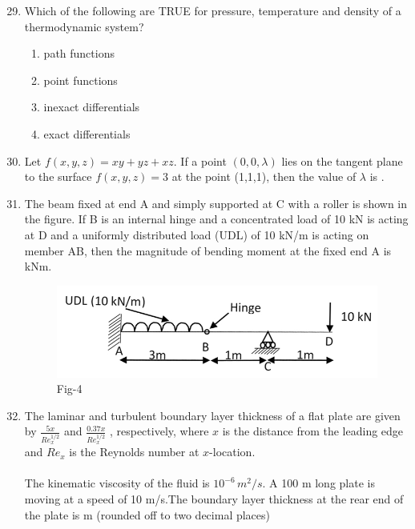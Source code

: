 \documentclass[journal]{IEEEtran}
\theoremstyle{remark}
\begin{document}
\begin{enumerate}[itemsep=1em]
\setcounter{enumi}{28}
\item Which of the following are TRUE for pressure, temperature and density of a thermodynamic system?
\begin{enumerate}[leftmargin=2.5em, labelsep=0.5em, itemsep=0.5em]
    \item path functions 
    \item point functions 
    \item inexact differentials 
    \item exact differentials 
\end{enumerate}
\end{enumerate}

\begin{enumerate}[itemsep=1em]
\setcounter{enumi}{29}
\item Let $f(x,y,z)=xy+yz+xz$. If a point $(0,0,\lambda)$ lies on the tangent plane to the surface $f(x,y,z)=3$ at the point (1,1,1), then the value of $\lambda$ is \underline{\hspace{2cm}} . 
\end{enumerate}

\newpage
\vspace*{0.25cm}

\begin{enumerate}[itemsep=1em]
\setcounter{enumi}{30}
\item The beam fixed at end A and simply supported at C with a roller is shown in the figure. If B is an internal hinge and a concentrated load of 10 kN is acting at D and a uniformly distributed load (UDL) of 10 kN/m is acting on member AB, then the magnitude of bending moment at the fixed end A is \underline{\hspace{2cm}}  kNm. 
\begin{figure}[H]
    \centering
    \includegraphics[width=0.6\columnwidth]{figs/fig-4.jpeg}
    \caption*{Fig-4}
    \label{fig-4}
\end{figure}

\end{enumerate}

\begin{enumerate}[itemsep=1em]
\setcounter{enumi}{31}
\item The laminar and turbulent boundary layer thickness of a flat plate are given by $\frac{5x}{Re_x^{1/2}}$ and $\frac{0.37x}{Re_x^{1/2}}$ , respectively, where $x$ is the distance from the leading edge and $Re_x$ is the Reynolds number at $x$-location. \\
\\
The kinematic viscosity of the fluid is $10^{-6}\, m^2/s$. A 100 m long plate is moving at a speed of 10 m/s.The boundary layer thickness at the rear end of the plate is \underline{\hspace{2cm}} m (rounded off to two decimal places)
\end{enumerate}
\end{document}
